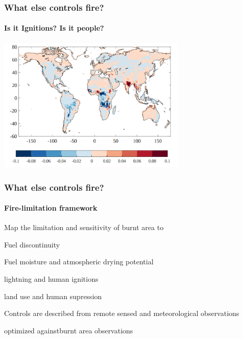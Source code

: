 
\begin{frame}
    \frametitle{What else controls fire?}
    \framesubtitle{Is it Ignitions? Is it people?}
    \includegraphics[width=9.0cm]{images/INFERNO}%
\end{frame}




\begin{frame}
    \frametitle{What else controls fire?}
    \framesubtitle{Fire-limitation framework}
	\begin{itemize}
		 {\item Map the limitation and sensitivity of burnt area to}
        \begin{itemize}
             {\item Fuel discontinuity}
             {\item Fuel moisture and atmospheric drying potential}
             {\item lightning and human ignitions}
             {\item land use and human supression}
        \end{itemize}
		 {\item Controls are described from remote sensed and meteorological observations}
		 {\item optimized againstburnt area observations}
	\end{itemize}
\end{frame}
